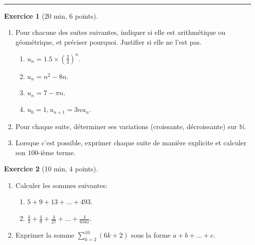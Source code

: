 \documentclass{exam}
\theoremstyle{definition}
\newtheorem{exercice}{Exercice}
\begin{document}
\Large



~\\



\medskip\hrule

\begin{exercice}[20 min, 6 points]
    \begin{enumerate}
        \item Pour chacune des suites suivantes, indiquer si elle est arithmétique ou géométrique, et préciser pourquoi. Justifier si elle ne l’est pas.
        \begin{enumerate}
            \item $u_n = 1.5 \times (\frac{2}{3})^n$.
            \item $u_n = n^2 - 8n$.
            \item $u_n = 7 - \pi n$.
            \item $u_0 = 1, u_{n+1} = 3nu_n$.
        \end{enumerate}
        \item Pour chaque suite, déterminer ses variations (croissante, décroissante) sur $\mathbb{N}$.
        \item Lorsque c'est possible, exprimer chaque suite de manière explicite et calculer son $100$-ième terme.
    \end{enumerate}
\end{exercice}

\vfill

\begin{exercice}[10 min, 4 points]
\begin{enumerate}
    \item Calculer les sommes suivantes:
    \begin{enumerate}
        \item $5+9+13+\dots+493$.
        \item $\frac{4}{3}+\frac{4}{9}+\frac{4}{27}+\dots+\frac{4}{6561}$.
    \end{enumerate}
    \item Exprimer la somme $\sum_{k=2}^{10}(6k+2)$ sous la forme $a+b+\dots+c$.
\end{enumerate}

\vfill
    
\end{exercice}
\end{document}
